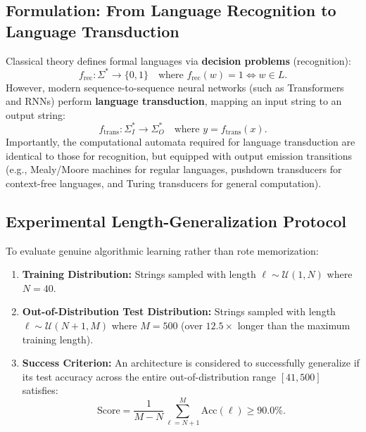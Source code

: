 \documentclass[11pt,a4paper]{article}
\begin{document}
\subsection{Formulation: From Language Recognition to Language Transduction}
Classical theory defines formal languages via \textbf{decision problems} (recognition):
\begin{equation}
    f_{\text{rec}}: \Sigma^* \to \{0, 1\} \quad \text{where } f_{\text{rec}}(w) = 1 \iff w \in L.
\end{equation}
However, modern sequence-to-sequence neural networks (such as Transformers and RNNs) perform \textbf{language transduction}, mapping an input string to an output string:
\begin{equation}
    f_{\text{trans}}: \Sigma_I^* \to \Sigma_O^* \quad \text{where } y = f_{\text{trans}}(x).
\end{equation}
Importantly, the computational automata required for language transduction are identical to those for recognition, but equipped with output emission transitions (e.g., Mealy/Moore machines for regular languages, pushdown transducers for context-free languages, and Turing transducers for general computation).

\subsection{Experimental Length-Generalization Protocol}
To evaluate genuine algorithmic learning rather than rote memorization:
\begin{enumerate}[leftmargin=1.5em, itemsep=2pt]
    \item \textbf{Training Distribution:} Strings sampled with length $\ell \sim \mathcal{U}(1, N)$ where $N = 40$.
    \item \textbf{Out-of-Distribution Test Distribution:} Strings sampled with length $\ell \sim \mathcal{U}(N+1, M)$ where $M = 500$ (over $12.5\times$ longer than the maximum training length).
    \item \textbf{Success Criterion:} An architecture is considered to successfully generalize if its test accuracy across the entire out-of-distribution range $[41, 500]$ satisfies:
    \begin{equation}
        \text{Score} = \frac{1}{M - N} \sum_{\ell = N+1}^{M} \text{Acc}(\ell) \ge 90.0\%.
    \end{equation}
\end{enumerate}

\end{document}
